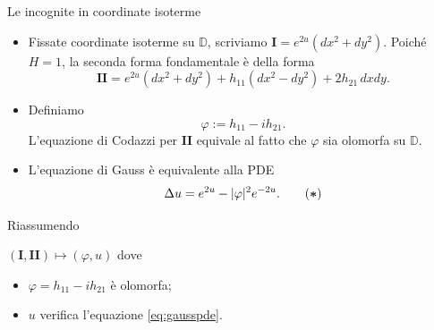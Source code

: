 \documentclass[aspectratio=169,11pt]{beamer}
\newcommand{\D}{\mathbb{D}}
\newcommand{\I}{\mathbf{I}}
\newcommand{\II}{\mathbf{II}}
\begin{document}
\begin{frame}{Le incognite in coordinate isoterme}
\begin{itemize}
	\setlength\itemsep{2mm}

	\item Fissate coordinate isoterme su $\D$, scriviamo
	$\I=e^{2u}(dx^2+dy^2)$. Poiché $H=1$, la seconda forma fondamentale
	è della forma
	\[
		\II=e^{2u}(dx^2+dy^2)
		+h_{11}(dx^2-dy^2)+2h_{21}\,dxdy.
	\]

	\item Definiamo
	\[
		\varphi:=h_{11}-ih_{21}.
	\]
	L'equazione di Codazzi per $\II$ equivale al fatto che $\varphi$ sia
	olomorfa su $\D$.

	\item L'equazione di Gauss è equivalente alla PDE
	\begin{align}
		\Delta u=e^{2u}-|\varphi|^2e^{-2u}.
		\tag{\boldmath{$*$}} \label{eq:gausspde}
	\end{align}
\end{itemize}

\begin{center}
\begin{minipage}{0.72\textwidth}
\begin{block}{Riassumendo} 
	\begin{center}
		$(\I,\II)\longmapsto(\varphi,u)$ dove

		\vspace{1mm}
		\begin{minipage}{0.72\linewidth}
		\begin{itemize}
			\item $\varphi=h_{11}-ih_{21}$ è olomorfa;
			\item $u$ verifica l'equazione \eqref{eq:gausspde}.
		\end{itemize}
		\end{minipage}
	\end{center}
\end{block}
\end{minipage}
\end{center}
\end{frame}
\end{document}
